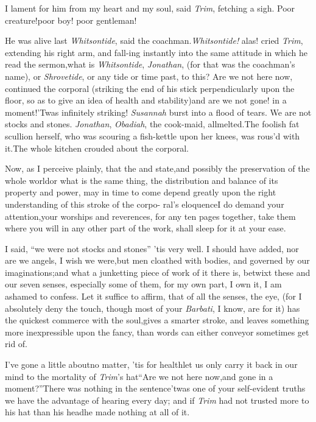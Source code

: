 \documentclass{article}
\begin{document}
I lament for him from my heart and my soul, said \textit{Trim},
fetching a sigh.\tsk\break 
Poor creature!\tsk poor boy! poor
gentleman!

\tsk He was alive last \textit{Whitsontide}, said the
coachman.\tsk \textit{Whitsontide!} alas! cried
\textit{Trim}, extending his right arm, and fall-\break ing
instantly into the same attitude in which he read the
sermon,\tsk what is \textit{Whitsontide}, \textit{Jonathan},
(for that was the coachman’s name), or \textit{Shrovetide},
or any tide or time past, to this? Are we not here now,
continued the corporal (striking the end of his stick
perpendicularly upon the floor, so as to give an idea of
health and stability)\tsk and are we not\tsk 
{}
gone! in a moment!\tsk ’Twas infinitely
striking! \textit{Susannah} burst into a flood of tears.\tsk
We are not stocks and stones.\tsk\break
\textit{Jonathan}, \textit{Obadiah}, the cook-maid,
all\break melted.\tsk The foolish fat
scullion herself, who was scouring a fish-kettle upon her
knees, was rous’d with it.\tsk The whole kitchen crouded
about the corporal.

Now, as I perceive plainly, that the  and state,\tsk and possibly the
preservation of the whole world\tsk or what is the same thing,
the distribution and balance of its property and power, may in time
to come depend greatly upon the right 
understanding of this stroke of the corpo- ral’s
eloquence\tsk I do demand your attention,\tsk your worships and
reverences, for any ten pages together, take them where you will in
any other part of the work, shall sleep for it at your ease.

\enlargethispage\baselineskip
I said, “we were not stocks and stones”\break
\tsk ’tis very well. I should have added,\break 
nor are we angels, I wish we were,\tsk but\break
men cloathed with bodies, and governed\break
by our imaginations;\tsk and what a jun\-ketting piece of work of it
there is, betwixt these and our seven senses, especially
some of them, for my own part, I own it, I am ashamed to
confess. Let it suffice to affirm, that of all the senses,
the eye, (for I absolutely deny the touch, though most of
your \textit{Barbati}, I know,\break
are for it) has the quickest
commerce with the soul,\tsk gives a smarter stroke, and
leaves something more inexpressible upon the fancy, than
words can either convey\tsk or sometimes get rid of.

\tsk I’ve gone a little about\tsk no matter,
’tis for health\tsk let us only carry it back in our mind
to the mortality of \textit{Trim}’s hat\tsk “Are we not
here now,\tsk and gone in a moment?”\tsk There was
nothing in the sentence\tsk ’twas one of your self-evident
truths we have the advantage of hearing every day; and if
\textit{Trim} had not trusted more to his hat than his head\tsk he
made nothing at all of it.
\end{document}
